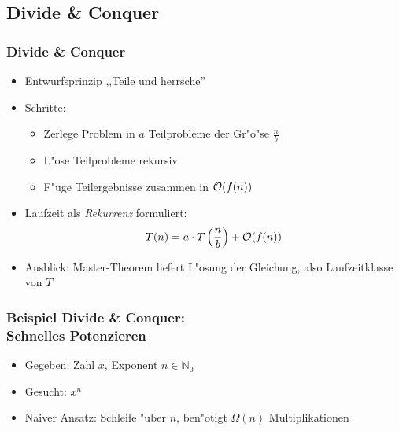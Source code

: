 \subsection{Divide \& Conquer}
\begin{frame}
  \frametitle{Divide \& Conquer}
  \begin{itemize}
  \item Entwurfsprinzip ,,Teile und herrsche''
  \item Schritte:
    \begin{itemize}
    \item Zerlege Problem in $a$ Teilprobleme der Gr"o"se $\frac{n}{b}$
    \item L"ose Teilprobleme rekursiv
    \item F"uge Teilergebnisse zusammen in $\mathcal{O}(f(n))$
    \end{itemize}
  \item Laufzeit als \emph{Rekurrenz} formuliert:
    \[T(n) = a\cdot T\left(\frac{n}{b}\right) + \mathcal{O}(f(n))\]
  \item Ausblick: Master-Theorem liefert L"osung der Gleichung, also Laufzeitklasse von
        $T$
  \end{itemize}
\end{frame}

\begin{frame}
  \frametitle{Beispiel Divide \& Conquer: \\ Schnelles Potenzieren}
  \begin{itemize}
  \item Gegeben: Zahl $x$, Exponent $n \in \mathbb{N}_0$
  \item Gesucht: $x^n$
  \item Naiver Ansatz: Schleife "uber $n$, ben"otigt $\Omega(n)$ Multiplikationen
  \end{itemize}
\end{frame}



